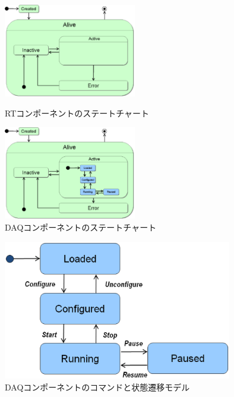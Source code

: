 \documentclass[a4j,10pt,dvips,onecolumn,oneside,final]{jarticle}%
\begin{document}
\begin{figure}[htbp]
 \begin{minipage}{0.48\hsize}
  \begin{center}
   \includegraphics[width=58mm]{rtc-state.eps}
  \end{center}
  \caption{RTコンポーネントのステートチャート}
  \label{rtc-state.fig}
 \end{minipage}
\hfill
 \begin{minipage}{0.48\hsize}
  \begin{center}
   \includegraphics[width=58mm]{daq-state.eps}
  \end{center}
  \caption{DAQコンポーネントのステートチャート}
  \label{daq-state.fig}
 \end{minipage}
\end{figure}
 \begin{figure}[h]
   \vspace{-5mm}
  \begin{center}
   \includegraphics[width=100mm]{daq-state-only.eps}
   \vspace{-5mm}
   \caption{DAQコンポーネントのコマンドと状態遷移モデル}
  \label{command-state.fig}
  \end{center}
 \end{figure}
\end{document}
